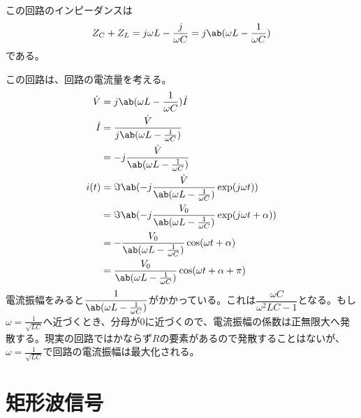\documentclass[fontsize=10.5pt]{jlreq}
\begin{document}
この回路のインピーダンスは
\begin{equation}
    Z_C+Z_L=j\omega L - \frac{j}{\omega C}=j\ab(\omega L - \frac{1}{\omega C}) \label{eq.ZC+ZL}
\end{equation}
である。

この回路は、回路の電流量を考える。
\begin{align}
    \dot{V} &= j\ab(\omega L - \frac{1}{\omega C}) \dot{I} \\
    \dot{I} &= \dfrac{\dot{V}}{j\ab(\omega L - \frac{1}{\omega C})} \\
    &= -j\dfrac{\dot{V}}{\ab(\omega L - \frac{1}{\omega C})} \\
    i(t) &= \Im\ab(-j\dfrac{\dot{V}}{\ab(\omega L - \frac{1}{\omega C})}\exp(j \omega t)) \\
    &= \Im\ab(-j\dfrac{V_0}{\ab(\omega L - \frac{1}{\omega C})}\exp(j \omega t + \alpha)) \\
    &= -\dfrac{V_0}{\ab(\omega L - \frac{1}{\omega C})}\cos(\omega t + \alpha) \\
    &= \dfrac{V_0}{\ab(\omega L - \frac{1}{\omega C})}\cos(\omega t + \alpha + \pi)
\end{align}
電流振幅をみると\(\dfrac{1}{\ab(\omega L - \frac{1}{\omega C})}\)がかかっている。これは\(\dfrac{\omega C}{\omega^2 LC -1}\)となる。もし\(\omega = \tfrac{1}{\sqrt{LC}}\)へ近づくとき、分母が\(0\)に近づくので、電流振幅の係数は正無限大へ発散する。現実の回路ではかならず\(R\)の要素があるので発散することはないが、\(\omega = \tfrac{1}{\sqrt{LC}}\)で回路の電流振幅は最大化される。

\section{矩形波信号}
\end{document}
